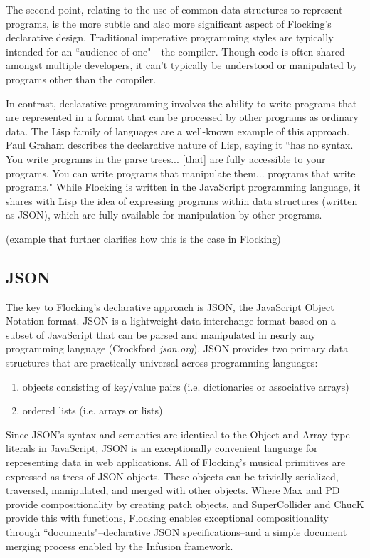 \documentclass{article}
\begin{document}
The second point, relating to the use of common data structures to represent programs, is the more subtle and also more significant aspect of Flocking’s declarative design. Traditional imperative programming styles are typically intended for an ``audience of one"---the compiler. Though code is often shared amongst multiple developers, it can’t typically be understood or manipulated by programs other than the compiler.

In contrast, declarative programming involves the ability to write programs that are represented in a format that can be processed by other programs as ordinary data. The Lisp family of languages are a well-known example of this approach. Paul Graham describes the declarative nature of Lisp, saying it ``has no syntax. You write programs in the parse trees... [that] are fully accessible to your programs. You can write programs that manipulate them... programs that write programs." While Flocking is written in the JavaScript programming language, it shares with Lisp the idea of expressing programs within data structures (written as JSON), which are fully available for manipulation by other programs.

(example that further clarifies how this is the case in Flocking)

\subsection{JSON}

The key to Flocking's declarative approach is JSON, the JavaScript Object Notation format. JSON is a lightweight data interchange format based on a subset of JavaScript that can be parsed and manipulated in nearly any programming language (Crockford {\it json.org}). JSON provides two primary data structures that are practically universal across programming languages:

\begin{enumerate}
\item objects consisting of key/value pairs (i.e. dictionaries or associative arrays)
\item ordered lists (i.e. arrays or lists)
\end{enumerate}

Since JSON's syntax and semantics are identical to the Object and Array type literals in JavaScript, JSON is an exceptionally convenient language for representing data in web applications. All of Flocking's musical primitives are expressed as trees of JSON objects. These objects can be trivially serialized, traversed, manipulated, and merged with other objects. Where Max and PD provide compositionality by creating patch objects, and SuperCollider and ChucK provide this with functions, Flocking enables exceptional compositionality through ``documents"--declarative JSON specifications--and a simple document merging process enabled by the Infusion framework.
\end{document}

